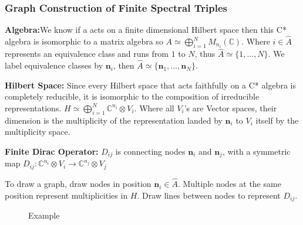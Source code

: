 \documentclass[a4paper]{article}
\theoremstyle{definition}
\theoremstyle{definition}
\theoremstyle{definition}
\theoremstyle{theorem}
\theoremstyle{theorem}
\theoremstyle{theorem}
\theoremstyle{definition}
\begin{document}
\subsubsection{Graph Construction of Finite Spectral Triples}
\textbf{Algebra:}We know if a acts on a finite dimensional Hilbert space then
this C* algebra is isomorphic to a matrix algebra so $A \simeq
\bigoplus_{i=1}^{N}M_{n_i}(\mathbb{C})$. Where $i\in
\hat{A}$ represents an equivalence class and runs from $1$ to $N$,
thus $\hat{A}\simeq\{1,\dots, N\}$. We label equivalence classes by
$\textbf{n}_i$, then $\hat{A}\simeq\{\textbf{n}_1,\dots,\textbf{n}_N\}$.
\newline

\textbf{Hilbert Space:} Since every Hilbert space that acts faithfully on a
C* algebra is completely reducible, it is isomorphic to the composition
of irreducible representations. $H \simeq \bigoplus_{i=1}^N\mathbb{C}^{n_i}
\otimes V_i$. Where all $V_i$'s are Vector spaces, their dimension is the
multiplicity of the representation landed by $\textbf{n}_i$ to $V_i$ itself
by the multiplicity space.
\newline

\textbf{Finite Dirac Operator:} $D_{ij}$ is connecting nodes $\textbf{n}_i$
and $\textbf{n}_j$, with a symmetric map $D_{ij}:\mathbb{C}^{n_i}\otimes V_i
\rightarrow \mathbb{C}^{n_j}\otimes V_j$
\newline

To draw a graph, draw nodes in position $\textbf{n}_i\in \hat{A}$.
Multiple nodes at the same position represent multiplicities in $H$.
Draw lines between nodes to represent $D_{ij}$.

\begin{figure}[h!]
    \centering
{}
    \caption{Example}
\end{figure}
\end{document}
